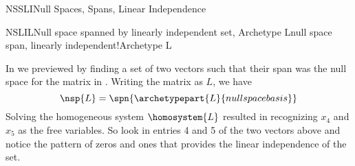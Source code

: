 \begin{subsect}{NSSLI}{Null Spaces, Spans, Linear Independence}
%
\begin{example}{NSLIL}{Null space spanned by linearly independent set,  Archetype L}{null space span, linearly independent!Archetype L}
\begin{para}In  we previewed  by finding a set of two vectors such that their span was the null space for the matrix in .  Writing the matrix as $L$, we have
%
\begin{equation*}
\nsp{L}=
\spn{\archetypepart{L}{nullspacebasis}}\end{equation*}
%
Solving the homogeneous system $\homosystem{L}$ resulted in recognizing $x_4$ and $x_5$ as the free variables.  So look in entries 4 and 5 of the two vectors above and notice the pattern of zeros and ones that provides the linear independence of the set.\end{para}
%
\end{example}
%
%
\end{subsect}
%

